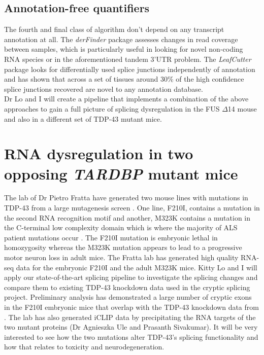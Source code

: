 \subsection{Annotation-free quantifiers}
The fourth and final class of algorithm don't depend on any transcript annotation at all. The \textit{derFinder} package \citep{ColladoTorres2015} assesses changes in read coverage between samples, which is particularly useful in looking for novel non-coding RNA species or in the aforementioned tandem 3'UTR problem. The \textit{LeafCutter} package \citep{Li2016} looks for differentially used splice junctions independently of annotation and has shown that across a set of tissues around 30\% of the high confidence splice junctions recovered are novel to any annotation database.\\

Dr Lo and I will create a pipeline that implements a combination of the above approaches to gain a full picture of splicing dysregulation in the FUS $\Delta$14 mouse and also in a different set of TDP-43 mutant mice.



\section{RNA dysregulation in two opposing \textit{TARDBP} mutant mice}

The lab of Dr Pietro Fratta have generated two mouse lines with mutations in TDP-43 from a large mutagenesis screen \citep{Ricketts2014}. One line, F210I, contains a mutation in the second RNA recognition motif and another, M323K contains a mutation in the C-terminal low complexity domain which is where the majority of ALS patient mutations occur \citep{Sreedharan2008-xv}. The F210I mutation is embryonic lethal in homozygosity whereas the M323K mutation appears to lead to a progressive motor neuron loss in adult mice. The Fratta lab has generated high quality RNA-seq data for the embryonic F210I and the adult M323K mice. Kitty Lo and I will apply our state-of-the-art splicing pipeline to investigate the splicing changes and compare them to existing TDP-43 knockdown data used in the cryptic splicing project. 
Preliminary analysis has demonstrated a large number of cryptic exons in the F210I embryonic mice that overlap with the TDP-43 knockdown data from \citep{Polymenidou2011}. The lab has also generated iCLIP data by precipitating the RNA targets of the two mutant proteins (Dr Agnieszka Ule and Prasanth Sivakumar). It will be very interested to see how the two mutations alter TDP-43's splicing functionality and how that relates to toxicity and neurodegeneration.

